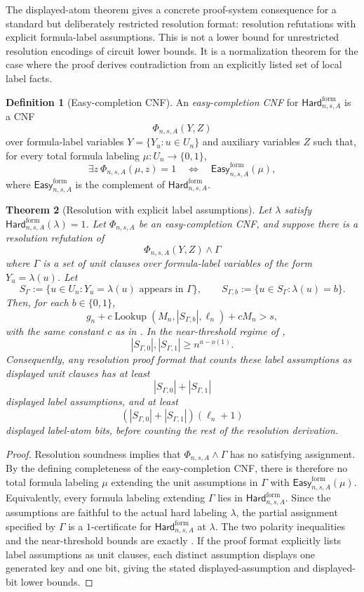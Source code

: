 \documentclass[11pt]{article}
\newtheorem{theorem}{Theorem}[section]
\theoremstyle{definition}
\newtheorem{definition}[theorem]{Definition}
\newcommand{\bits}{\{0,1\}}
\newcommand{\Lookup}{\operatorname{Lookup}}
\newcommand{\HardF}{\mathsf{Hard}^{\mathrm{form}}}
\newcommand{\EasyF}{\mathsf{Easy}^{\mathrm{form}}}
\begin{document}
The displayed-atom theorem gives a concrete proof-system consequence for a standard but deliberately restricted resolution format: resolution refutations with explicit formula-label assumptions.  This is not a lower bound for unrestricted resolution encodings of circuit lower bounds.  It is a normalization theorem for the case where the proof derives contradiction from an explicitly listed set of local label facts.

\begin{definition}[Easy-completion CNF]\label{def:easy-completion-cnf}
An \emph{easy-completion CNF} for \(\HardF_{n,s,A}\) is a CNF
\[
  \Phi_{n,s,A}(Y,Z)
\]
over formula-label variables \(Y=\{Y_u:u\in U_n\}\) and auxiliary variables \(Z\) such that, for every total formula labeling \(\mu:U_n\to\bits\),
\[
  \exists z\ \Phi_{n,s,A}(\mu,z)=1
  \quad\Longleftrightarrow\quad
  \EasyF_{n,s,A}(\mu),
\]
where \(\EasyF_{n,s,A}\) is the complement of \(\HardF_{n,s,A}\).
\end{definition}

\begin{theorem}[Resolution with explicit label assumptions]\label{thm:assumption-resolution}
Let \(\lambda\) satisfy \(\HardF_{n,s,A}(\lambda)=1\).  Let \(\Phi_{n,s,A}\) be an easy-completion CNF, and suppose there is a resolution refutation of
\[
  \Phi_{n,s,A}(Y,Z)\wedge \Gamma
\]
where \(\Gamma\) is a set of unit clauses over formula-label variables of the form \(Y_u=\lambda(u)\).  Let
\[
  S_\Gamma:=\{u\in U_n: Y_u=\lambda(u)\text{ appears in }\Gamma\},
  \qquad
  S_{\Gamma,b}:=\{u\in S_\Gamma:\lambda(u)=b\}.
\]
Then, for each \(b\in\bits\),
\[
  g_n+c\Lookup(M_n,|S_{\Gamma,b}|,\ell_n)+cM_n>s,
\]
with the same constant \(c\) as in .  In the near-threshold regime of ,
\[
  |S_{\Gamma,0}|,|S_{\Gamma,1}|\ge n^{a-o(1)}.
\]
Consequently, any resolution proof format that counts these label assumptions as displayed unit clauses has at least
\[
  |S_{\Gamma,0}|+|S_{\Gamma,1}|
\]
displayed label assumptions, and at least
\[
  (|S_{\Gamma,0}|+|S_{\Gamma,1}|)(\ell_n+1)
\]
displayed label-atom bits, before counting the rest of the resolution derivation.
\end{theorem}

\begin{proof}
Resolution soundness implies that \(\Phi_{n,s,A}\wedge\Gamma\) has no satisfying assignment.  By the defining completeness of the easy-completion CNF, there is therefore no total formula labeling \(\mu\) extending the unit assumptions in \(\Gamma\) with \(\EasyF_{n,s,A}(\mu)\).  Equivalently, every formula labeling extending \(\Gamma\) lies in \(\HardF_{n,s,A}\).  Since the assumptions are faithful to the actual hard labeling \(\lambda\), the partial assignment specified by \(\Gamma\) is a \(1\)-certificate for \(\HardF_{n,s,A}\) at \(\lambda\).  The two polarity inequalities and the near-threshold bounds are exactly .  If the proof format explicitly lists label assumptions as unit clauses, each distinct assumption displays one generated key and one bit, giving the stated displayed-assumption and displayed-bit lower bounds.
\end{proof}
\end{document}
